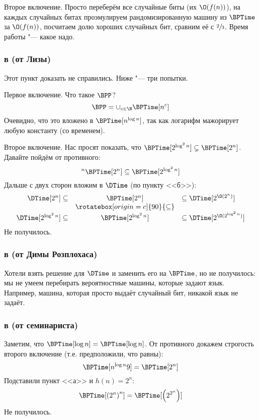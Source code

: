 		Второе включение.
		Просто переберём все случайные биты (их $\O(f(n))$), на каждых случайных битах проэмулируем рандомизированную машину из $\BPTime$
		за $\O(f(n))$, посчитаем долю хороших случайных бит, сравним её с $\sfrac 23$.
		Время работы "--- какое надо.

	\subsubsection{в (от Лизы)}
		Этот пункт доказать не справились.
		Ниже "--- три попытки.

		Первое включение.
		Что такое $\BPP$?
		\[ \BPP = \cup_{c \in \N} \BPTime[n^c] \]
		Очевидно, что это вложено в $\BPTime[n^{\log n}]$, так как логарифм мажорирует любую константу (со временем).

		Второе включение.
		Нас просят показать, что $\BPTime[2^{\log^2n}] \subsetneq \BPTime[2^n]$.
		Давайте пойдём от противного:
		\[                                         ^n
			\BPTime[2^n] \subseteq \BPTime[2^{\log^2n}]
		\]
		Дальше с двух сторон вложим в $\DTime$ (по пункту <<б>>):
		\begin{gather*}
			\begin{array}{rcl}
				\DTime[2^n] \subseteq & \BPTime[2^n] & \subseteq \DTime[2^{\O(2^n)}] \\
				& \rotatebox[origin=c]{90}{\subseteq} & \\
				\DTime[2^{\log^2n}] \subseteq & \BPTime[2^{\log^2n}] & \subseteq \DTime[2^{\O(2^{\log^2 n})}]
			\end{array}
		\end{gather*}
		Не получилось.

	\subsubsection{в (от Димы Розплохаса)}
		Хотели взять решение для $\DTime$ и заменить его на $\BPTime$, но не получилось:
		мы не умеем перебирать вероятностные машины, которые задают язык.
		Например, машина, которая просто выдаёт случайный бит, никакой язык не задаёт.

	\subsubsection{в (от семинариста)}
		Заметим, что $\BPTime[\log n] = \BPTime[\log n]$.
		От противного докажем строгость второго включение (т.е. предположили, что равны):
		\[
			\BPTime[n^{\log n}9] = \BPTime[2^n]
		\]
		Подставили пункт <<а>> и $h(n)=2^n$:
		\[
			\BPTime[\left(2^n\right)^n] = \BPTime[\left(2^{2^n}\right)]
		\]
		Не получилось.

